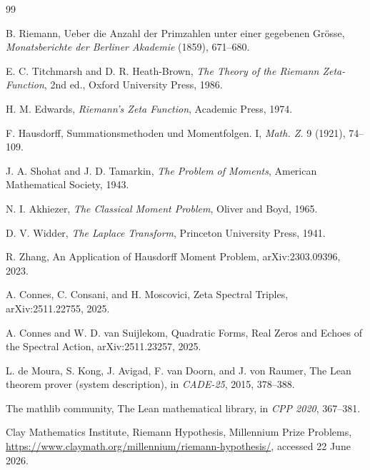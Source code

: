\documentclass[11pt]{article}
\theoremstyle{definition}
\begin{document}
\begin{thebibliography}{99}

B. Riemann,
\newblock Ueber die Anzahl der Primzahlen unter einer gegebenen Grösse,
\newblock \emph{Monatsberichte der Berliner Akademie} (1859), 671--680.

E. C. Titchmarsh and D. R. Heath-Brown,
\newblock \emph{The Theory of the Riemann Zeta-Function}, 2nd ed.,
\newblock Oxford University Press, 1986.

H. M. Edwards,
\newblock \emph{Riemann's Zeta Function},
\newblock Academic Press, 1974.

F. Hausdorff,
\newblock Summationsmethoden und Momentfolgen. I,
\newblock \emph{Math. Z.} 9 (1921), 74--109.

J. A. Shohat and J. D. Tamarkin,
\newblock \emph{The Problem of Moments},
\newblock American Mathematical Society, 1943.

N. I. Akhiezer,
\newblock \emph{The Classical Moment Problem},
\newblock Oliver and Boyd, 1965.

D. V. Widder,
\newblock \emph{The Laplace Transform},
\newblock Princeton University Press, 1941.

R. Zhang,
\newblock An Application of Hausdorff Moment Problem,
\newblock arXiv:2303.09396, 2023.

A. Connes, C. Consani, and H. Moscovici,
\newblock Zeta Spectral Triples,
\newblock arXiv:2511.22755, 2025.

A. Connes and W. D. van Suijlekom,
\newblock Quadratic Forms, Real Zeros and Echoes of the Spectral Action,
\newblock arXiv:2511.23257, 2025.

L. de Moura, S. Kong, J. Avigad, F. van Doorn, and J. von Raumer,
\newblock The Lean theorem prover (system description),
\newblock in \emph{CADE-25}, 2015, 378--388.

The mathlib community,
\newblock The Lean mathematical library,
\newblock in \emph{CPP 2020}, 367--381.

Clay Mathematics Institute,
\newblock Riemann Hypothesis, Millennium Prize Problems,
\newblock \url{https://www.claymath.org/millennium/riemann-hypothesis/}, accessed 22 June 2026.

\end{thebibliography}
\end{document}
